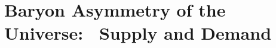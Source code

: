 \documentclass[12pt]{revtex4}
\newcommand{\GeV}{{\rm GeV}}
\begin{document}
%
%
		


%
%
\section{Baryon Asymmetry of the Universe: ~Supply and Demand}
\end{document}
